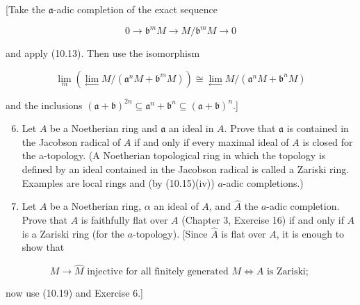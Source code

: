 \documentclass{standalone}
\theoremstyle{definition}
\theoremstyle{remark}
\begin{document}
[Take the $\mathfrak{a}$-adic completion of the exact sequence

\[
0 \rightarrow \mathfrak{b}^{m} M \rightarrow M / \mathfrak{b}^{m} M \rightarrow 0
\]

and apply (10.13). Then use the isomorphism

\[
\underset{m}{\lim }\left(\underset{\leftarrow}{\lim } M /\left(\mathfrak{a}^{n} M+\mathfrak{b}^{m} M\right)\right) \cong \underset{\leftarrow}{\lim } M /\left(\mathfrak{a}^{n} M+\mathfrak{b}^{n} M\right)
\]

and the inclusions $(\mathfrak{a}+\mathfrak{b})^{2 n} \subseteq \mathfrak{a}^{n}+\mathfrak{b}^{n} \subseteq(\mathfrak{a}+\mathfrak{b})^{n}$.]

\begin{enumerate}
  \setcounter{enumi}{5}
  \item Let $A$ be a Noetherian ring and $\mathfrak{a}$ an ideal in $A$. Prove that $\mathfrak{a}$ is contained in the Jacobson radical of $A$ if and only if every maximal ideal of $A$ is closed for the a-topology. (A Noetherian topological ring in which the topology is defined by an ideal contained in the Jacobson radical is called a Zariski ring. Examples are local rings and (by (10.15)(iv)) $a$-adic completions.)

  \item Let $A$ be a Noetherian ring, $\alpha$ an ideal of $A$, and $\hat{A}$ the $a$-adic completion. Prove that $A$ is faithfully flat over $A$ (Chapter 3, Exercise 16) if and only if $A$ is a Zariski ring (for the $a$-topology). [Since $\hat{A}$ is flat over $A$, it is enough to show that

\end{enumerate}

\[
M \rightarrow \hat{M} \text { injective for all finitely generated } M \Leftrightarrow A \text { is Zariski; }
\]

now use (10.19) and Exercise 6.]
\end{document}
